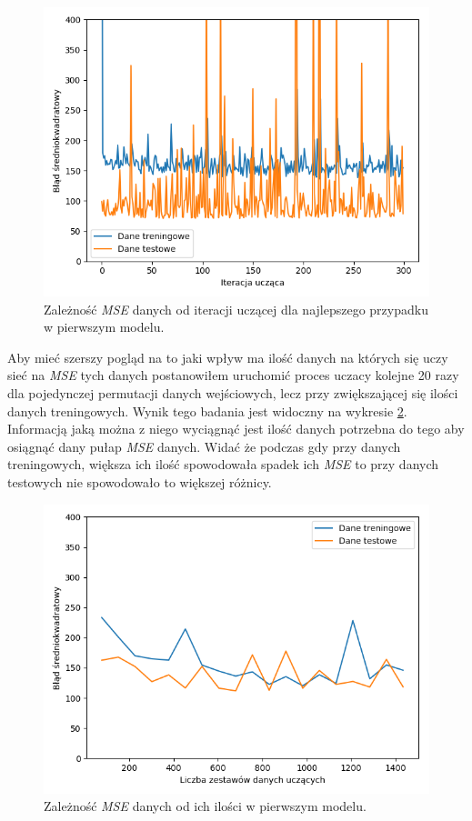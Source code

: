 \documentclass[12pt]{aghdpl}
\newenvironment{tightcenter}{
  \setlength\topsep{0pt}
  \setlength\parskip{0pt}
  \begin{center}
}{
  \end{center}
}
\begin{document}
		\begin{figure}[h]
	 		\begin{tightcenter}
	 			\includegraphics[width = 0.75\linewidth]{rysunki/pierwszy_model_wykres_uczenia.png}
	 		\end{tightcenter}
	 		
 			\caption{Zależność \textit{MSE} danych od iteracji uczącej dla najlepszego przypadku w pierwszym modelu.}
			\label{fig: pierwszy_model_wykres_uczenia}
		\end{figure}
		
		Aby mieć szerszy pogląd na to jaki wpływ ma ilość danych na których się uczy sieć na \textit{MSE} tych danych postanowiłem	uruchomić proces uczacy kolejne 20 razy dla pojedynczej permutacji danych wejściowych, lecz przy zwiększającej się ilości danych treningowych. Wynik tego badania jest widoczny na wykresie \ref{fig: pierwszy_model_learning_curves}. Informacją jaką można z niego wyciągnąć jest ilość danych potrzebna do tego aby osiągnąć dany pułap \textit{MSE} danych. Widać że podczas gdy przy danych treningowych, większa ich ilość spowodowała spadek ich \textit{MSE} to przy danych testowych nie spowodowało to większej różnicy.
		
		\begin{figure}[h]
	 		\begin{tightcenter}
	 			\includegraphics[width = 0.75\linewidth]{rysunki/pierwszy_model_learning_curves.png}
	 		\end{tightcenter}
	 		
 			\caption{Zależność \textit{MSE} danych od ich ilości w pierwszym modelu.}
			\label{fig: pierwszy_model_learning_curves}
		\end{figure}
		
\end{document}
